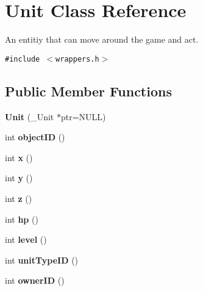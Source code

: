 \hypertarget{classUnit}{
\section{Unit Class Reference}
\label{classUnit}
}
An entitiy that can move around the game and act.  


{\tt \#include $<$wrappers.h$>$}

\subsection*{Public Member Functions}
\begin{CompactItemize}
\item 
\hypertarget{classUnit_137b06047ff3c863b7b8b11d6166b23b}{
\textbf{Unit} (\_\-Unit $\ast$ptr=NULL)}
\label{classUnit_137b06047ff3c863b7b8b11d6166b23b}

\item 
\hypertarget{classUnit_621a32dd222ff61ae2b449929f4ca8ec}{
int \textbf{objectID} ()}
\label{classUnit_621a32dd222ff61ae2b449929f4ca8ec}

\item 
\hypertarget{classUnit_eaaab5b23cb47ac5a73b765e23d822eb}{
int \textbf{x} ()}
\label{classUnit_eaaab5b23cb47ac5a73b765e23d822eb}

\item 
\hypertarget{classUnit_ed8851f757a1d06dc12a36714436cf5d}{
int \textbf{y} ()}
\label{classUnit_ed8851f757a1d06dc12a36714436cf5d}

\item 
\hypertarget{classUnit_c0c37e2f02206836aee89d79f26c7444}{
int \textbf{z} ()}
\label{classUnit_c0c37e2f02206836aee89d79f26c7444}

\item 
\hypertarget{classUnit_b64b87b4b5111ccbc2891515148fa5b8}{
int \textbf{hp} ()}
\label{classUnit_b64b87b4b5111ccbc2891515148fa5b8}

\item 
\hypertarget{classUnit_72c9eaba718ba5f4116bd273d38d8522}{
int \textbf{level} ()}
\label{classUnit_72c9eaba718ba5f4116bd273d38d8522}

\item 
\hypertarget{classUnit_ca492d37ca3c44ce203e497d571f59d4}{
int \textbf{unitTypeID} ()}
\label{classUnit_ca492d37ca3c44ce203e497d571f59d4}

\item 
\hypertarget{classUnit_95a85f91e1969c5340765de82c203625}{
int \textbf{ownerID} ()}
\label{classUnit_95a85f91e1969c5340765de82c203625}


\end{CompactItemize}
